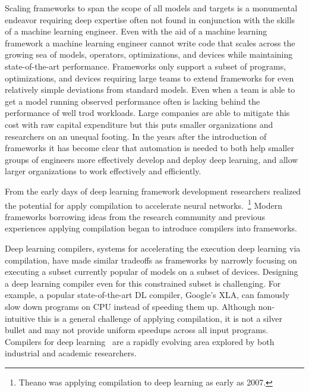Scaling frameworks to span the scope of all models and targets is a monumental endeavor
  requiring deep expertise often not found in conjunction with the skills of a
  machine learning engineer.
Even with the aid of a machine learning framework a machine learning engineer
  cannot write code that scales across the growing sea of
  models, operators, optimizations, and devices while maintaining state-of-the-art performance.
Frameworks only support a subset of programs, optimizations, and devices
  requiring large teams to extend frameworks for even relatively simple deviations
  from standard models.
Even when a team is able to get a model running observed performance often
  is lacking behind the performance of well trod workloads.
Large companies are able to mitigate this cost with raw capital expenditure
  but this puts smaller organizations and researchers on an unequal footing.
In the years after the introduction of frameworks it has become clear
  that automation is needed to both help smaller groups of engineers
  more effectively develop and deploy deep learning, and allow larger
  organizations to work effectively and efficiently.

From the early days of deep learning framework development researchers realized the
  potential for apply compilation to accelerate neural networks.~\footnote{Theano was applying
  compilation to deep learning as early as 2007.}
Modern frameworks borrowing ideas from the research community and previous
  experiences applying compilation began to introduce compilers into frameworks.

Deep learning compilers, systems for accelerating the execution deep learning via compilation,
 have made similar tradeoffs as frameworks by narrowly focusing on executing a subset
 currently popular of models on a subset of devices.
Designing a deep learning compiler even for this constrained subset is challenging.
For example,
  a popular state-of-the-art DL compiler,
  Google's XLA, can famously slow down programs on
  CPU instead of speeding them up.
Although non-intuitive this is a general challenge of applying compilation,
  it is not a silver bullet and may not provide uniform speedups across all input programs.
Compilers for deep learning~\citep{xla,jax,glow,tvm_osdi18,myia,fluxjl,lattner2020mlir} are
  a rapidly evolving area explored by both industrial and academic researchers.

